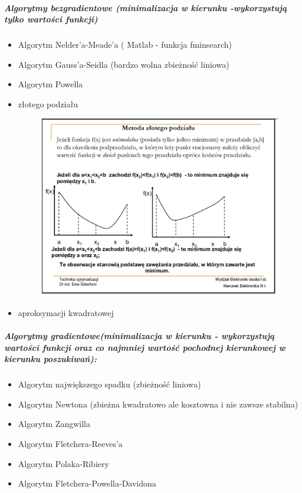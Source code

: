 \documentclass[a4paper,twoside]{report}
\begin{document}
		\subparagraph{Algorytmy bezgradientowe (minimalizacja w kierunku -wykorzystują tylko wartości funkcji)}
		\begin{itemize}
			\item Algorytm Nelder’a-Meade’a ( Matlab - funkcja fminsearch)
			\item Algorytm Gauss’a-Seidla (bardzo wolna zbieżność
			liniowa)
			\item Algorytm Powella 
			\item złotego podziału
			
			\begin{figure}[H]
				\includegraphics[scale=0.5
				]{obrazy/optymalizacja/opt10.png}
			\end{figure} 
			\item aproksymacji kwadratowej
		\end{itemize}
		
		\subparagraph{Algorytmy gradientowe(minimalizacja w kierunku - wykorzystują wartości funkcji oraz co najmniej wartość pochodnej 
			kierunkowej w kierunku poszukiwań):}
		\begin{itemize}
			\item Algorytm największego spadku (zbieżność liniowa)
			\item Algorytm Newtona (zbieżna
			kwadratowo ale kosztowna i 
			nie zawsze stabilna)
			\item Algorytm Zangwilla
			\item Algorytm Fletchera-Reeves’a
			\item Algorytm Polaka-Ribiery
			\item Algorytm Fletchera-Powella-Davidona
		\end{itemize}
		
\end{document}
